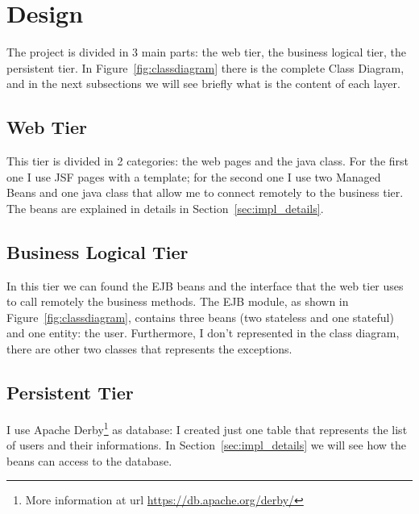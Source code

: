 \documentclass[a4paper]{article}
\begin{document}
\section{Design}
\label{sec:design}
The project is divided in 3 main parts: the web tier, the business logical tier, the persistent tier. In Figure~\ref{fig:classdiagram} there is the complete Class Diagram, and in the next subsections we will see briefly what is the content of each layer.

\subsection{Web Tier}
\label{subsec:webtier}
This tier is divided in 2 categories: the web pages and the java class. For the first one I use JSF pages with a template; for the second one I use two Managed Beans and one java class that allow me to connect remotely to the business tier. The beans are explained in details in Section~\ref{sec:impl_details}.

\subsection{Business Logical Tier}
\label{subsec:bus_log_tier}
In this tier we can found the EJB beans and the interface that the web tier uses to call remotely the business methods. The EJB module, as shown in Figure~\ref{fig:classdiagram}, contains three beans (two stateless and one stateful) and one entity: the user. Furthermore, I don't represented in the class diagram, there are other two classes that represents the exceptions.

\subsection{Persistent Tier}
\label{subsec:pers_tier}
I use Apache Derby\footnote{More information at url \url{https://db.apache.org/derby/}} as database: I created just one table that represents the list of users and their informations. In Section~\ref{sec:impl_details} we will see how the beans can access to the database.
\end{document}
